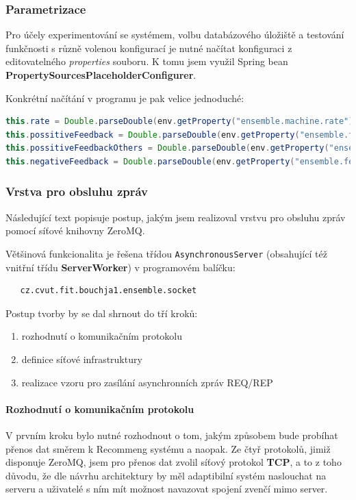 \documentclass[thesis=M,czech]{FITthesis}[2014/05/07]
\begin{document}
\subsubsection{Parametrizace}
\label{param}
Pro účely experimentování se systémem, volbu databázového úložiště a testování funkčnosti s různě volenou konfigurací je nutné načítat konfiguraci z editovatelného \emph{properties} souboru. K tomu jsem využil Spring bean \textbf{PropertySourcesPlaceholderConfigurer}.

Konkrétní načítání v programu je pak velice jednoduché:

\begin{lstlisting}[language=java]
this.rate = Double.parseDouble(env.getProperty("ensemble.machine.rate"));
this.possitiveFeedback = Double.parseDouble(env.getProperty("ensemble.feedback.possitive.winner"));
this.possitiveFeedbackOthers = Double.parseDouble(env.getProperty("ensemble.feedback.possitive.losers"));
this.negativeFeedback = Double.parseDouble(env.getProperty("ensemble.feedback.negative.stupid"));
\end{lstlisting}

\subsubsection{Vrstva pro obsluhu zpráv}
\label{sub:messvrs}
Následující text popisuje postup, jakým jsem realizoval vrstvu pro obsluhu zpráv pomocí síťové knihovny ZeroMQ.

Většinová funkcionalita je řešena třídou \texttt{AsynchronousServer} (obsahující též vnitřní třídu \textbf{ServerWorker}) v programovém balíčku:

\begin{verbatim}
   cz.cvut.fit.bouchja1.ensemble.socket
\end{verbatim}

Postup tvorby by se dal shrnout do tří kroků:

\begin{enumerate}
	\item rozhodnutí o komunikačním protokolu
	\item definice síťové infrastruktury
	\item realizace vzoru pro zasílání asynchronních zpráv REQ/REP
\end{enumerate}

\paragraph{Rozhodnutí o komunikačním protokolu}
\label{subsub:kompr}
V prvním kroku bylo nutné rozhodnout o tom, jakým způsobem bude probíhat přenos dat směrem k Recommeng systému a naopak. Ze čtyř protokolů, jimiž disponuje ZeroMQ, jsem pro přenos dat zvolil síťový protokol \textbf{TCP}, a to z toho důvodu, že dle návrhu architektury by měl adaptibilní systém naslouchat na serveru a uživatelé s ním mít možnost navazovat spojení zvenčí mimo server.
\end{document}
